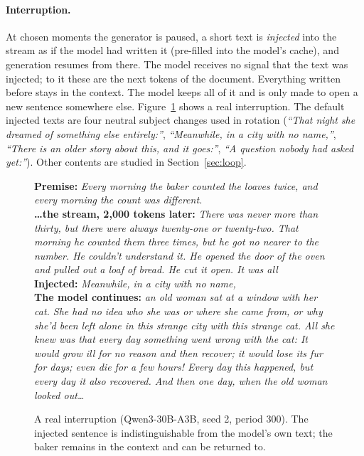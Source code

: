 \paragraph{Interruption.} At chosen moments the generator is paused, a short
text is \emph{injected} into the stream as if the model had written it
(pre-filled into the model's cache), and generation resumes from there. The
model receives no signal that the text was injected; to it these are the
next tokens of the document. Everything written before stays in the context.
The model keeps all of it and is only made to open a new sentence somewhere
else. Figure~\ref{fig:example} shows a real interruption. The default
injected texts are four neutral subject changes used in rotation
(\emph{``That night she dreamed of something else entirely:''},
\emph{``Meanwhile, in a city with no name,''}, \emph{``There is an older
story about this, and it goes:''}, \emph{``A question nobody had asked
yet:''}). Other contents are studied in Section~\ref{sec:loop}.

\begin{figure}[t]
\centering
\begin{minipage}{0.96\linewidth}\small
\textbf{Premise:} \emph{Every morning the baker counted the loaves twice, and every morning the count was different.}\\[0.3em]
\textbf{\ldots the stream, 2,000 tokens later:} \emph{There was never more than thirty, but there were always twenty-one or twenty-two. That morning he counted them three times, but he got no nearer to the number. He couldn't understand it. He opened the door of the oven and pulled out a loaf of bread. He cut it open. It was all}\\[0.3em]
\textbf{Injected:} \emph{Meanwhile, in a city with no name,}\\[0.3em]
\textbf{The model continues:} \emph{an old woman sat at a window with her cat. She had no idea who she was or where she came from, or why she'd been left alone in this strange city with this strange cat. All she knew was that every day something went wrong with the cat: It would grow ill for no reason and then recover; it would lose its fur for days; even die for a few hours! Every day this happened, but every day it also recovered. And then one day, when the old woman looked out\ldots}
\end{minipage}
\caption{A real interruption (Qwen3-30B-A3B, seed 2, period 300). The
injected sentence is indistinguishable from the model's own text; the baker
remains in the context and can be returned to.}
\label{fig:example}
\end{figure}

